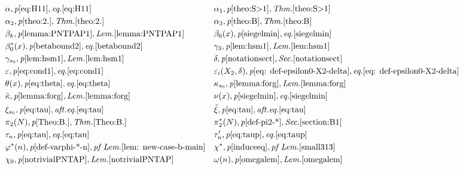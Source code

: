 \documentclass[12pt]{amsart}
\begin{document}
\small{
\begin{align*}
    &\alpha,\textit{p}\pageref{eq:H11},\textit{eq.}\eqref{eq:H11} &
    &\alpha_1,\textit{p}\pageref{theo:S>1},\textit{Thm.}\ref{theo:S>1} \\
    &\alpha_2,\textit{p}\pageref{theo:2.},\textit{Thm.}\ref{theo:2.} &
    &\alpha_3,\textit{p}\pageref{theo:B},\textit{Thm.}\ref{theo:B} \\
    &\beta_k,\textit{p}\pageref{lemma:PNTPAP1},\textit{Lem.}\ref{lemma:PNTPAP1} &
    &\beta_0(x),\textit{p}\pageref{siegelmin},\textit{eq.}\eqref{siegelmin}\\
    &\beta_0^*(x),\textit{p}\pageref{betabound2},\textit{eq.}\eqref{betabound2} &
    &\gamma_{3},\textit{p}\pageref{lem:hsm1},\textit{Lem.}\ref{lem:hsm1}\\
    &\gamma_{s_0},\textit{p}\pageref{lem:hsm1},\textit{Lem.}\ref{lem:hsm1}&
    &\delta,\textit{p}\pageref{notationsect},\textit{Sec.} \ref{notationsect}\\
    &\varepsilon,\textit{p}\pageref{eq:cond1},\textit{eq.}\eqref{eq:cond1} &
    &\varepsilon_i(X_2,\delta),\textit{p}\pageref{eq: def-epsilon0-X2-delta},\textit{eq.}\eqref{eq: def-epsilon0-X2-delta} \\
    &\theta(x),\textit{p}\pageref{eq:theta},\textit{eq.}\eqref{eq:theta}&
    &\kappa_{s_0},\textit{p}\pageref{lemma:forg},\textit{Lem.}\ref{lemma:forg}\\
    &\tilde{\kappa},\textit{p}\pageref{lemma:forg},\textit{Lem.}\ref{lemma:forg}&
    &\nu(x),\textit{p}\pageref{siegelmin},\textit{eq.}\eqref{siegelmin}\\
    &\xi_{s_0},\textit{p}\pageref{eq:tau},\textit{aft.eq.}\eqref{eq:tau}&
    &\tilde{\xi},\textit{p}\pageref{eq:tau},\textit{aft.eq.}\eqref{eq:tau}\\
    &\pi_2(N),\textit{p}\pageref{Theo:B.},\textit{Thm.}\ref{Theo:B.} &
    &\pi^*_2(N),\textit{p}\pageref{def-pi2-*},\textit{Sec.} \ref{section:B1}\\
    &\tau_n,\textit{p}\pageref{eq:tau},\textit{eq.}\eqref{eq:tau}&
    &\tau'_n,\textit{p}\pageref{eq:taup},\textit{eq.}\eqref{eq:taup}\\
    &\varphi^*(n),\textit{p}\pageref{def-varphi-*-n},\textit{pf Lem.}\ref{lem: new-case-b-main} &
    &\chi^*,\textit{p}\pageref{induceeq},\textit{pf Lem.}\ref{small313}\\
    &\chi_0,\textit{p}\pageref{notrivialPNTAP},\textit{Lem.}\ref{notrivialPNTAP}&
    &\omega(n),\textit{p}\pageref{omegalem},\textit{Lem.}\ref{omegalem} \\

\end{align*}}
\end{document}
